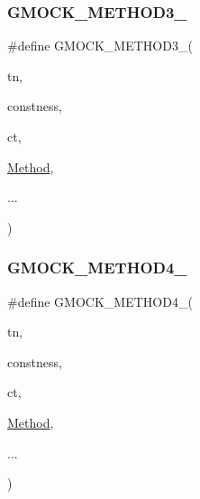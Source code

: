 \subsubsection{\texorpdfstring{GMOCK\_METHOD3\_}{GMOCK\_METHOD3\_}}
{\footnotesize\ttfamily \#define G\+M\+O\+C\+K\+\_\+\+M\+E\+T\+H\+O\+D3\+\_\+(\begin{DoxyParamCaption}\item[{}]{tn,  }\item[{}]{constness,  }\item[{}]{ct,  }\item[{}]{\mbox{\hyperlink{_obj__test_2lib_2googletest-release-1_88_81_2googlemock_2test_2gmock-spec-builders__test_8cc_a95606368148f3e5aab5db46c32466afd}{Method}},  }\item[{}]{... }\end{DoxyParamCaption})}

\mbox{\label{googletest-master_2googlemock_2include_2gmock_2gmock-generated-function-mockers_8h_ab6430f2cfad9de4aca5258ea559294bb}} 
\subsubsection{\texorpdfstring{GMOCK\_METHOD4\_}{GMOCK\_METHOD4\_}}
{\footnotesize\ttfamily \#define G\+M\+O\+C\+K\+\_\+\+M\+E\+T\+H\+O\+D4\+\_\+(\begin{DoxyParamCaption}\item[{}]{tn,  }\item[{}]{constness,  }\item[{}]{ct,  }\item[{}]{\mbox{\hyperlink{_obj__test_2lib_2googletest-release-1_88_81_2googlemock_2test_2gmock-spec-builders__test_8cc_a95606368148f3e5aab5db46c32466afd}{Method}},  }\item[{}]{... }\end{DoxyParamCaption})}

\mbox{\label{googletest-master_2googlemock_2include_2gmock_2gmock-generated-function-mockers_8h_a9e3ecd392499ab19a4a6d3adcabf56f6}} 
